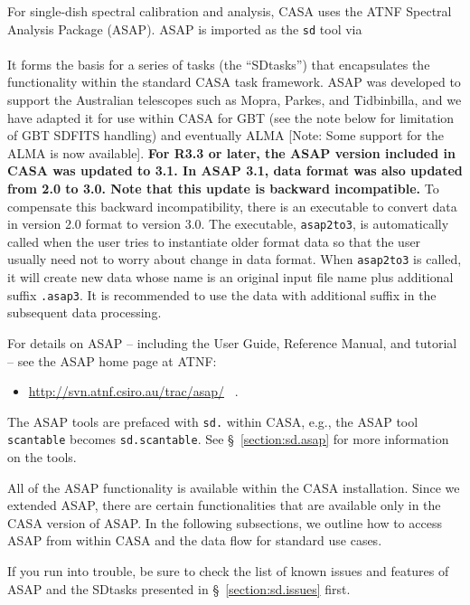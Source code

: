 For single-dish spectral calibration and analysis, 
CASA uses the ATNF Spectral Analysis Package (ASAP).
ASAP is
imported as the {\tt sd} tool via \\


\\

It forms the basis for a series
of tasks (the ``SDtasks'') that encapsulates the functionality
within the standard CASA task framework.  ASAP was developed to
support the Australian telescopes such as Mopra, Parkes, and
Tidbinbilla, and we have adapted it for use within CASA for
GBT (see the note below for limitation of GBT SDFITS handling) 
and eventually ALMA [Note: Some support for the ALMA is now available].  
{\bf For R3.3 or later, the ASAP version included in CASA was updated to 3.1. 
In ASAP 3.1, data format was also updated from 2.0 to 3.0. 
Note that this update is backward incompatible.}
To compensate this backward incompatibility, there is an executable to convert 
data in version 2.0 format to version 3.0. 
The executable, {\tt asap2to3}, is automatically called when the user tries to 
instantiate older format data so that the user usually need not to worry about 
change in data format. When {\tt asap2to3} is called, it will create new data 
whose name is an original input file name plus additional suffix {\tt .asap3}. 
It is recommended to use the data with additional suffix in the subsequent 
data processing. 

For details on ASAP -- including the User Guide, Reference Manual, and tutorial -- see
the ASAP home page at ATNF: 
\begin{itemize}
   \item \url{http://svn.atnf.csiro.au/trac/asap/} \, .
\end{itemize}
The ASAP tools are prefaced with {\tt sd.} within CASA, e.g., the ASAP tool {\tt scantable} becomes
{\tt sd.scantable}.  See \S~\ref{section:sd.asap} for more
information on the tools.

All of the ASAP functionality is available within the CASA
installation.  Since we extended ASAP, there
are certain functionalities that are available only in the CASA version of ASAP.
In the following subsections, we outline how to access ASAP
from within CASA and the data flow for standard use cases.

If you run into trouble, be sure to check the list of known issues
and features of ASAP and the SDtasks presented in 
\S~\ref{section:sd.issues} first.

